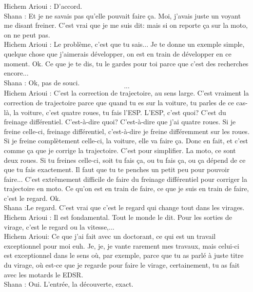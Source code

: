 Hichem Arioui : D'accord. \\
Shana : Et je ne savais pas qu'elle pouvait faire ça. Moi, j'avais juste un voyant me disant freiner. C'est vrai que je me suis dit: mais si on reporte ça sur la moto, on ne peut pas. \\
Hichem Arioui : Le problème, c'est que tu sais... Je te donne un exemple simple, quelque chose que j'aimerais développer, on est en train de développer en ce moment. Ok. Ce que je te dis, tu le gardes pour toi parce que c'est des recherches encore... \\
Shana : Ok, pas de souci.\\
\[...\]
\ifconfidentiel
Hichem Arioui : C'est la correction de trajectoire, au sens large. C'est vraiment la correction de trajectoire parce que quand tu es sur la voiture, tu parles de ce cas-là, la voiture, c'est quatre roues, tu fais l'ESP. L'ESP, c'est quoi? C'est du freinage différentiel. C'est-à-dire quoi? C'est-à-dire que j'ai quatre roues. Si je freine celle-ci, freinage différentiel, c'est-à-dire je freine différemment sur les roues. Si je freine complètement celle-ci, la voiture, elle va faire ça. Donc en fait, et c'est comme ça que je corrige la trajectoire. C'est pour simplifier. La moto, ce sont deux roues. Si tu freines celle-ci, soit tu fais ça, ou tu fais ça, ou ça dépend de ce que tu fais exactement. Il faut que tu te penches un petit peu pour pouvoir faire... C'est extrêmement difficile de faire du freinage différentiel pour corriger la trajectoire en moto. Ce qu'on est en train de faire, ce que je suis en train de faire, c'est le regard. Ok. \\
\fi
Shana :Le regard. C'est vrai que c'est le regard qui change tout dans les virages. \\
Hichem Arioui : Il est fondamental.
Tout le monde le dit. Pour les sorties de virage, c'est le regard ou la vitesse,... \\
Hichem Arioui: Ce que j'ai fait avec un doctorant, ce qui est un travail exceptionnel pour moi euh. Je, je, je vante rarement mes travaux, mais celui-ci est exceptionnel dans le sens où, par exemple, parce que tu as parlé à juste titre du virage, où est-ce que je regarde pour faire le virage, certainement, tu as fait avec les motards le EDSR. \\
Shana : Oui. L'entrée, la découverte, exact. \\
